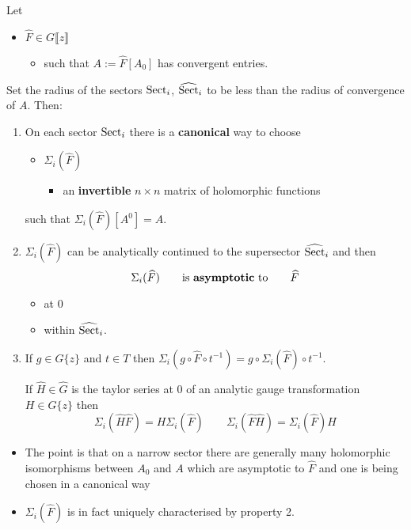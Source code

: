 \begin{thm}
  Let
  \begin{itemize}
    \item $\hat{F}\in G\llbracket z\rrbracket$
      \begin{itemize}
        \item such that $A:=\hat F[A_0]$ has convergent entries.
      \end{itemize}
  \end{itemize}
  Set the radius of the sectors $\Sect_i$, $\widehat\Sect_i$ to be less than
  the radius of convergence of $A$.
  Then:
  \begin{enumerate}
    \item On each sector $\Sect_i$ there is a \textbf{canonical} way to choose
      \begin{itemize}
        \item $\Sigma_i(\hat F)$
          \begin{itemize}
            \item an \textbf{invertible} $n\times n$ matrix of holomorphic
              functions
          \end{itemize}
      \end{itemize}
      such that $\Sigma_i(\hat F)[A^0]=A$.
    \item $\Sigma_i(\hat F)$ can be analytically continued to the supersector
      $\widehat\Sect_i$ and then
      \[
        \Sigma_i(\hat F)
        \qquad\text{is \textbf{asymptotic} to}\qquad
        \hat F
      \]
      \begin{itemize}
        \item at $0$
        \item within $\widehat\Sect_i$.
      \end{itemize}
    \item If $g\in G\{z\}$ and $t\in T$ then
      $\Sigma_i(g\circ\hat F \circ t^{-1})=g\circ\Sigma_i(\hat F)\circ t^{-1}$.
      \begin{prop}
        If $\hat H\in\hat G$ is the taylor series at $0$ of an analytic gauge
        transformation $H\in G\{z\}$ then
        \[
          \Sigma_i(\hat H \hat F)=H\Sigma_i(\hat F)
          \qquad
          \Sigma_i(\hat F \hat H)=\Sigma_i(\hat F)H
        \]
      \end{prop}
  \end{enumerate}
  \begin{rem}
    \begin{itemize}
      \item The point is that on a narrow sector there are generally many
        holomorphic isomorphisms between $A_0$ and $A$ which are asymptotic to
        $\hat F$ and one is being chosen in a canonical way
      \item $\Sigma_i(\hat F)$ is in fact uniquely characterised by property 2.
    \end{itemize}
  \end{rem}
\end{thm}

